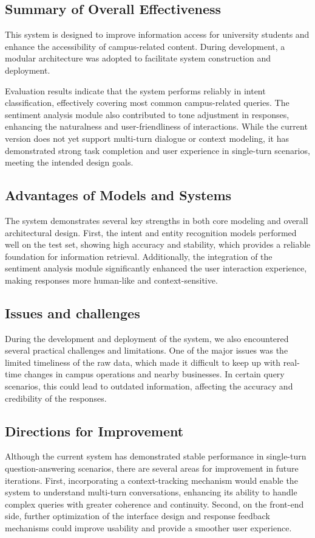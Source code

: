 \documentclass{xum_review}
\begin{document}
	\subsection{Summary of Overall Effectiveness}

	This system is designed to improve information access for university students and enhance the accessibility of
	campus-related content. During development, a modular architecture was adopted to facilitate system construction and
	deployment.

	Evaluation results indicate that the system performs reliably in intent classification, effectively covering most
	common campus-related queries. The sentiment analysis module also contributed to tone adjustment in responses,
	enhancing the naturalness and user-friendliness of interactions. While the current version does not yet support
	multi-turn dialogue or context modeling, it has demonstrated strong task completion and user experience in
	single-turn scenarios, meeting the intended design goals.


	\subsection{Advantages of Models and Systems}

	The system demonstrates several key strengths in both core modeling and overall architectural design. First, the
	intent and entity recognition models performed well on the test set, showing high accuracy and stability, which
	provides a reliable foundation for information retrieval. Additionally, the integration of the sentiment analysis
	module significantly enhanced the user interaction experience, making responses more human-like and
	context-sensitive.

	\subsection{Issues and challenges}

	During the development and deployment of the system, we also encountered several practical challenges and
	limitations. One of the major issues was the limited timeliness of the raw data, which made it difficult to keep up
	with real-time changes in campus operations and nearby businesses. In certain query scenarios, this could lead to
	outdated information, affecting the accuracy and credibility of the responses.

	\subsection{Directions for Improvement}

	Although the current system has demonstrated stable performance in single-turn question-answering scenarios, there
	are several areas for improvement in future iterations. First, incorporating a context-tracking mechanism would
	enable the system to understand multi-turn conversations, enhancing its ability to handle complex queries with
	greater coherence and continuity. Second, on the front-end side, further optimization of the interface design and
	response feedback mechanisms could improve usability and provide a smoother user experience.


\end{document}
